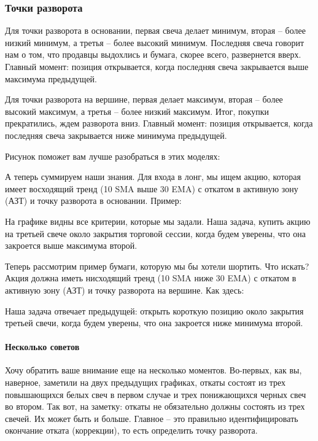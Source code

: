 \documentclass{book}
\begin{document}
\subsubsection{Точки разворота}

Для точки разворота в основании, первая свеча делает минимум, вторая – более низкий минимум, а третья – более высокий минимум. Последняя свеча говорит нам о том, что продавцы выдохлись и бумага, скорее всего, развернется вверх. Главный момент: позиция открывается, когда последняя свеча закрывается выше максимума предыдущей.

Для точки разворота на вершине, первая делает максимум, вторая – более высокий максимум, а третья – более низкий максимум. Итог, покупки прекратились, ждем разворота вниз. Главный момент: позиция открывается, когда последняя свеча закрывается ниже минимума предыдущей.

Рисунок поможет вам лучше разобраться в этих моделях:

А теперь суммируем наши знания. Для входа в лонг, мы ищем акцию, которая имеет восходящий тренд (10 SMA выше 30 EMA) с откатом в активную зону (АЗТ) и точку разворота в основании. Пример:

На графике видны все критерии, которые мы задали. Наша задача, купить акцию на третьей свече около закрытия торговой сессии, когда будем уверены, что она закроется выше максимума второй.

Теперь рассмотрим пример бумаги, которую мы бы хотели шортить. Что искать? Акция должна иметь нисходящий тренд (10 SMA ниже 30 EMA) с откатом в активную зону (АЗТ) и точку разворота на вершине. Как здесь:

Наша задача отвечает предыдущей: открыть короткую позицию около
закрытия третьей свечи, когда будем уверены, что она закроется ниже
минимума второй.

\paragraph{Несколько советов}

Хочу обратить ваше внимание еще на несколько моментов. Во-первых, как вы, наверное, заметили на двух предыдущих графиках, откаты состоят из трех повышающихся белых свеч в первом случае и трех понижающихся черных свеч во втором. Так вот, на заметку: откаты не обязательно должны состоять из трех свечей. Их может быть и больше. Главное – это правильно идентифицировать окончание отката (коррекции), то есть определить точку разворота.
\end{document}
